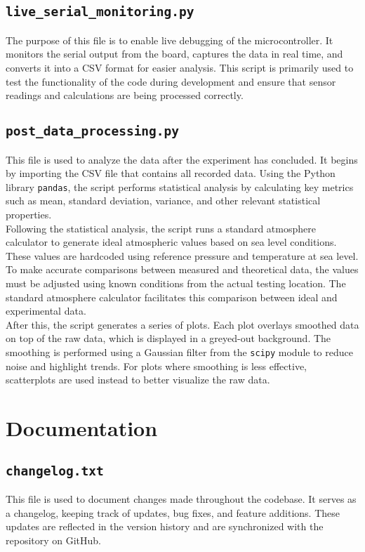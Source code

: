 \documentclass[12pt]{report}
\begin{document}
\subsection{\texttt{live\_serial\_monitoring.py}}
The purpose of this file is to enable live debugging of the microcontroller. It monitors the serial output from the board, captures the data in real time, and converts it into a CSV format for easier analysis. This script is primarily used to test the functionality of the code during development and ensure that sensor readings and calculations are being processed correctly.

\subsection{\texttt{post\_data\_processing.py}}

This file is used to analyze the data after the experiment has concluded. It begins by importing the CSV file that contains all recorded data. Using the Python library \texttt{pandas}, the script performs statistical analysis by calculating key metrics such as mean, standard deviation, variance, and other relevant statistical properties. \\

Following the statistical analysis, the script runs a standard atmosphere calculator to generate ideal atmospheric values based on sea level conditions. These values are hardcoded using reference pressure and temperature at sea level. To make accurate comparisons between measured and theoretical data, the values must be adjusted using known conditions from the actual testing location. The standard atmosphere calculator facilitates this comparison between ideal and experimental data. \\

After this, the script generates a series of plots. Each plot overlays smoothed data on top of the raw data, which is displayed in a greyed-out background. The smoothing is performed using a Gaussian filter from the \texttt{scipy} module to reduce noise and highlight trends. For plots where smoothing is less effective, scatterplots are used instead to better visualize the raw data. \\


\section{Documentation}
\subsection{\texttt{changelog.txt}}
This file is used to document changes made throughout the codebase. It serves as a changelog, keeping track of updates, bug fixes, and feature additions. These updates are reflected in the version history and are synchronized with the repository on GitHub.
\end{document}
